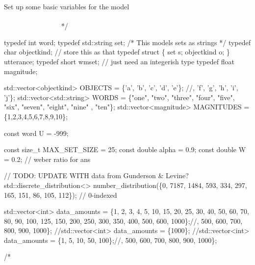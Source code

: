 \begin{DoxyCode}
    Set up some basic variables \textcolor{keywordflow}{for} the model
   ~~~~~~~~~~~~~~~~~~~~~~~~~~~~~~~~~~~~~~~~~~~~~~~~~~~~~~~~~~~~~~~~~~~~~~~~~~~~~~~~~~~~~~~~ */

\textcolor{keyword}{typedef} \textcolor{keywordtype}{int}         word;
\textcolor{keyword}{typedef} std::string \textcolor{keyword}{set};    \textcolor{comment}{/* This models sets as strings */}
\textcolor{keyword}{typedef} \textcolor{keywordtype}{char}        objectkind; \textcolor{comment}{// store this as that}
\textcolor{keyword}{typedef} \textcolor{keyword}{struct }\{ \textcolor{keyword}{set} s; objectkind o; \} utterance; 
\textcolor{keyword}{typedef} \textcolor{keywordtype}{short}       wmset; \textcolor{comment}{// just need an integerish type}
\textcolor{keyword}{typedef} \textcolor{keywordtype}{float}       magnitude; 

std::vector<objectkind>   OBJECTS = \{\textcolor{charliteral}{'a'}, \textcolor{charliteral}{'b'}, \textcolor{charliteral}{'c'}, \textcolor{charliteral}{'d'}, \textcolor{charliteral}{'e'}\}; \textcolor{comment}{//, 'f', 'g', 'h', 'i', 'j'\};}
std::vector<std::string>    WORDS = \{\textcolor{stringliteral}{"one"}, \textcolor{stringliteral}{"two"}, \textcolor{stringliteral}{"three"}, \textcolor{stringliteral}{"four"}, \textcolor{stringliteral}{"five"}, \textcolor{stringliteral}{"six"}, \textcolor{stringliteral}{"seven"}, \textcolor{stringliteral}{"eight"}, \textcolor{stringliteral}{"nine"}
      , \textcolor{stringliteral}{"ten"}\};
std::vector<magnitude> MAGNITUDES = \{1,2,3,4,5,6,7,8,9,10\};

\textcolor{keyword}{const} word U = -999;

\textcolor{keyword}{const} \textcolor{keywordtype}{size\_t} MAX\_SET\_SIZE = 25;
\textcolor{keyword}{const} \textcolor{keywordtype}{double} alpha = 0.9;
\textcolor{keyword}{const} \textcolor{keywordtype}{double} W = 0.2; \textcolor{comment}{// weber ratio for ans}

\textcolor{comment}{// TODO: UPDATE WITH data from Gunderson & Levine?}
std::discrete\_distribution<> number\_distribution(\{0, 7187, 1484, 593, 334, 297, 165, 151, 86, 105, 112\}); \textcolor{comment}{
      // 0-indexed}

std::vector<int> data\_amounts = \{1, 2, 3, 4, 5, 10, 15, 20, 25, 30, 40, 50, 60, 70, 80, 90, 100, 125, 150, 
      200, 250, 300, 350, 400, 500, 600, 1000\};\textcolor{comment}{//, 500, 600, 700, 800, 900, 1000\};}
\textcolor{comment}{//std::vector<int> data\_amounts = \{1000\};}
\textcolor{comment}{//std::vector<int> data\_amounts = \{1, 5, 10, 50, 100\};//, 500, 600, 700, 800, 900, 1000\};}

\textcolor{comment}{/*}
\end{DoxyCode}
